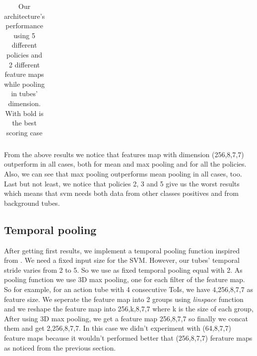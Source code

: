 \documentclass{report}
\begin{document}
\begin{center}
\begin{longtable}{||c | c | c| c||c c c||}
  \caption{Our architecture's performance using 5 different policies and 2 different feature maps while pooling in
  tubes' dimension. With bold is the best scoring case}
  \label{table:svm_first_results}
\end{longtable} 
\end{center}

From the above results we notice that features map with dimension (256,8,7,7) outperform in all cases, both for mean and max pooling and
for all the policies. Also, we can see that max pooling outperforms mean pooling in all cases, too. Last but not least, we notice that policies
2, 3 and 5 give us the worst results which means that svm needs both data from other classes positives and from background tubes. 

\subsection{Temporal pooling}
After getting first results, we implement a temporal pooling function inspired from \cite{DBLP:journals/corr/HouCS17}. We need a
fixed input size for the SVM. However, our tubes' temporal stride varies from 2 to 5. So we use as fixed temporal pooling equal
with 2. As pooling function we use 3D max pooling, one for each filter of the feature map.  So for example, for an action tube
with 4 consecutive ToIs, we  have 4,256,8,7,7 as feature size. We seperate the feature map into 2 groups using \textit{linspace}
function and we reshape the feature map into 256,k,8,7,7 where k is the size of each group, After using 3D max pooling, we get
a feature map 256,8,7,7 so finally we concat them and get 2,256,8,7,7. In this case we didn't experiment with (64,8,7,7) feature
maps because it wouldn't performed better that (256,8,7,7) ferature maps as noticed from the previous section.
\end{document}
